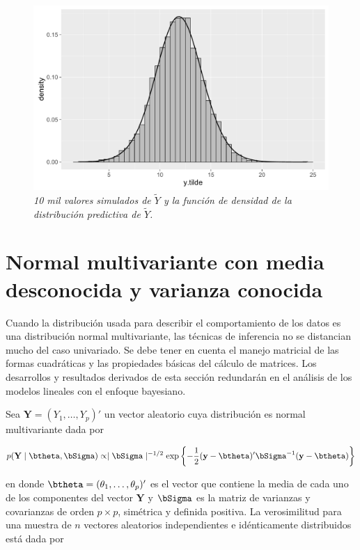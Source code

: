 \documentclass[10pt,openright]{book}\usepackage[]{graphicx}\usepackage[]{color}
\begin{document}
\begin{figure}[!htb]\label{predictiva_y_priori_noninformative}
\centering
\includegraphics[scale=0.5]{predictiva_y_priori_noninformative.pdf}
\caption{\emph{10 mil valores simulados de $\tilde{Y}$ y la funci\'on de densidad de la distribuci\'on predictiva de $\tilde{Y}$.}}
\end{figure}

\section{Normal multivariante con media desconocida y varianza conocida}

Cuando la distribuci\'on usada para describir el comportamiento de los datos es una distribuci\'on normal multivariante, las t\'ecnicas de inferencia no se distancian mucho del caso univariado. Se debe tener en cuenta el manejo matricial de las formas cuadr\'aticas y las propiedades b\'asicas del c\'alculo de matrices. Los desarrollos y resultados derivados de esta secci\'on redundar\'an en el an\'alisis de los modelos lineales con el enfoque bayesiano.

Sea $\mathbf{Y}=(Y_1,\ldots,Y_p)'$ un vector aleatorio cuya distribuci\'on es normal multivariante dada por

\begin{equation}
p(\mathbf{Y} \mid \btheta,\bSigma)\propto \mid \bSigma \mid ^{-1/2}
\exp\left\{-\frac{1}{2}(\mathbf{y}-\btheta)'\bSigma^{-1}(\mathbf{y}-\btheta)\right\}
  \end{equation}
  
en donde $\btheta=(\theta_1,\ldots,\theta_p)'$ es el vector que contiene la media de cada uno de los componentes del vector $\mathbf{Y}$ y $\bSigma$ es la matriz de varianzas y covarianzas de orden $p\times p$, sim\'etrica y definida positiva. La verosimilitud para una muestra de $n$ vectores aleatorios  independientes e id\'enticamente distribuidos est\'a dada por
\end{document}
